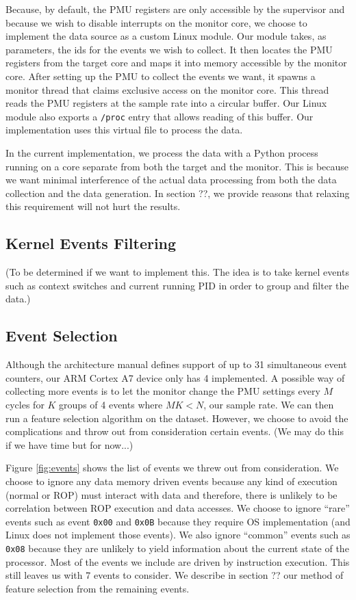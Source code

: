 \documentclass[letterpaper,twocolumn,10pt]{article}
\begin{document}
Because, by default, the PMU registers are only accessible by the supervisor and because 
we wish to disable interrupts on the monitor core, we choose to implement the data source as a 
custom Linux module. Our module takes, as parameters, the ids for the events we wish to collect. It then 
locates the PMU registers from the target core and maps it into memory accessible by the 
monitor core. After setting up the PMU to collect the events we want, it spawns a monitor 
thread that claims exclusive access on the monitor core. This thread reads the PMU registers 
at the sample rate into a circular buffer. Our Linux module also exports a \texttt{/proc} entry 
that allows reading of this buffer. Our implementation uses this virtual file to process the data.

In the current implementation, we process the data with a Python process running on a core 
separate from both the target and the monitor. This is because we want minimal interference 
of the actual data processing from both the data collection and the data generation. In 
section ??, we provide reasons that relaxing this requirement will not hurt the results.

\subsection*{Kernel Events Filtering}

(To be determined if we want to implement this. The idea is to take kernel events such 
as context switches and current running PID in order to group and filter the data.)

\subsection*{Event Selection}

Although the architecture manual\cite{ARMv7} defines support of up to 31 simultaneous event 
counters, our ARM Cortex A7 device only has 4 implemented. A possible way of collecting 
more events is to let the monitor change the PMU settings every $M$ cycles for $K$ groups of 4 events where 
$M K < N$, our sample rate. We can then run a feature selection algorithm on the dataset. However, we choose to avoid the complications and 
throw out from consideration certain events. (We may do this if we have time but for now...)

Figure \ref{fig:events} shows the list of events we threw out from consideration. We choose to 
ignore any data memory driven events because any kind of execution (normal or ROP) must interact 
with data and therefore, there is unlikely to be correlation between ROP execution and data 
accesses. We choose to ignore ``rare'' events such as event \texttt{0x00} and \texttt{0x0B} 
because they require OS implementation (and Linux does not implement those events). We also 
ignore ``common'' events such as \texttt{0x08} because they are unlikely to yield information 
about the current state of the processor. Most of the events we include are driven by 
instruction execution. This still leaves us with 7 events to consider. We describe 
in section ?? our method of feature selection from the remaining events.
\end{document}
